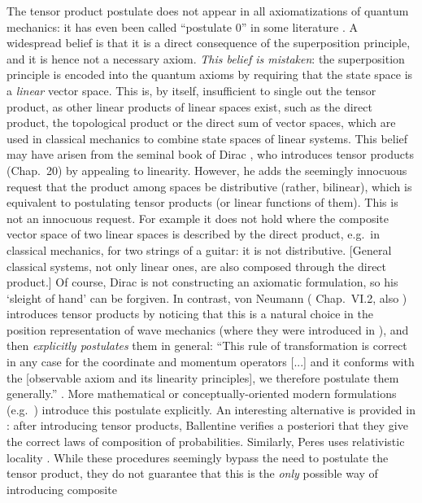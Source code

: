 \documentclass[aps,prl,amsmath,amssymb,twocolumn,nofootinbib]{revtex4}
\theoremstyle{plain}
\theoremstyle{definition}
\theoremstyle{remark}
\begin{document}
The tensor product postulate does not appear in all axiomatizations of
quantum mechanics: it has even been called ``postulate 0'' in some
literature \cite{zurek}. A widespread belief is that it is a direct
consequence of the superposition principle, and it is hence not a
necessary axiom. {\em This belief is mistaken}: the superposition
principle is encoded into the quantum axioms by requiring that the
state space is a {\em linear} vector space. This is, by itself,
insufficient to single out the tensor product, as other linear
products of linear spaces exist, such as the direct product, the
topological product or the direct sum of vector spaces, which are used
in classical mechanics to combine state spaces of linear systems.
This belief may have arisen from the seminal book of Dirac
\cite{diracbook}, who introduces tensor products (Chap.~20) by
appealing to linearity. However, he adds the seemingly innocuous
request that the product among spaces be distributive (rather,
bilinear), which is equivalent to postulating tensor products (or
linear functions of them). This is not an innocuous request. For
example it does not hold where the composite vector space of two
linear spaces is described by the direct product, e.g.~in classical
mechanics, for two strings of a guitar: it is not distributive.
[General classical systems, not only linear ones, are also composed
through the direct product.] Of course, Dirac is not constructing an axiomatic
formulation, so his `sleight of hand' can be forgiven. In contrast, von
Neumann (\cite{vonneumannbook} Chap.~VI.2, also \cite{jauch})
introduces tensor products by noticing that this is a natural choice
in the position representation of wave mechanics (where they were
introduced in \cite{weyl,epr}), and then {\em explicitly postulates}
them in general: ``This rule of transformation is correct in any case
for the coordinate and momentum operators [...] and it conforms with
the [observable axiom and its linearity principles], we therefore
postulate them generally.''  \cite{vonneumannbook}.  More mathematical
or conceptually-oriented modern formulations
(e.g.~\cite{ozawa,masanes,nielsenchuang}) introduce this postulate explicitly.
An interesting alternative is provided in
\cite{ballentinebook,ballentinepaper}: after introducing tensor
products, Ballentine verifies a posteriori that they give the correct
laws of composition of probabilities. Similarly, Peres uses
relativistic locality \cite{peres}. While these procedures seemingly
bypass the need to postulate the tensor product, they do not guarantee
that this is the {\em only} possible way of introducing composite
\end{document}
